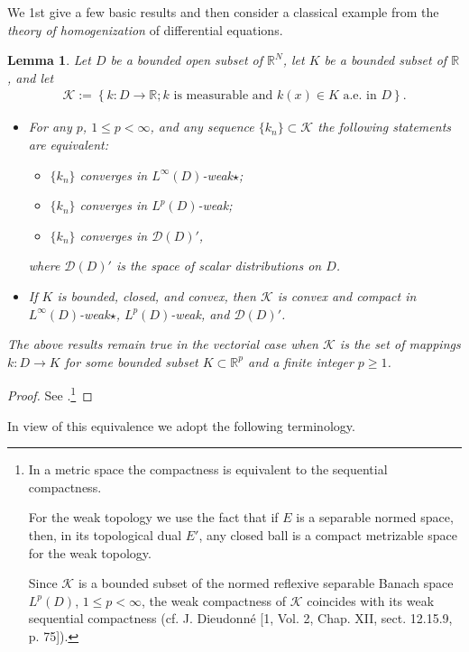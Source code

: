 \documentclass{book}
\numberwithin{equation}{section}
\newtheorem{lemma}{Lemma}[section]
\begin{document}
\begin{enumerate}
    We 1st give a few basic results and then consider a classical example from the \textit{theory of homogenization} of differential equations.
    
    \begin{lemma}
        Let $D$ be a bounded open subset of $\mathbb{R}^N$, let $K$ be a bounded subset of $\mathbb{R}$, and let
        \begin{align*}
            \mathcal{K} := \left\{k:D\to\mathbb{R};k \mbox{ is measurable and } k(x)\in K \mbox{ a.e. in } D\right\}.
        \end{align*}
        \begin{itemize}
            \item[(i)] For any $p$, $1\le p < \infty$, and any sequence $\{k_n\}\subset\mathcal{K}$ the following statements are equivalent:
            \begin{itemize}
                \item[(a)] $\{k_n\}$ converges in $L^\infty(D)$-weak$\star$;
                \item[(b)] $\{k_n\}$ converges in $L^p(D)$-weak;
                \item[(c)] $\{k_n\}$ converges in $\mathcal{D}(D)'$,
            \end{itemize}
            where $\mathcal{D}(D)'$ is the space of scalar distributions on $D$.
            \item[(ii)] If $K$ is bounded, closed, and convex, then $\mathcal{K}$ is convex and compact in $L^\infty(D)$-weak$\star$, $L^p(D)$-weak, and $\mathcal{D}(D)'$.
        \end{itemize}
        The above results remain true in the vectorial case when $\mathcal{K}$ is the set of mappings $k:D\to K$ for some bounded subset $K\subset\mathbb{R}^p$ and a finite integer $p\ge 1$.
    \end{lemma}
    
    \begin{proof}
        See \cite[p. 216]{Delfour_Zolesio2011}.\footnote{In a metric space the compactness is equivalent to the sequential compactness.
            
            For the weak topology we use the fact that if $E$ is a separable normed space, then, in its topological dual $E'$, any closed ball is a compact metrizable space for the weak topology.
            
            Since $\mathcal{K}$ is a bounded subset of the normed reflexive separable Banach space $L^p(D)$, $1\le p < \infty$, the weak compactness of $\mathcal{K}$ coincides with its weak sequential compactness (cf. J. Dieudonné [1, Vol. 2, Chap. XII, sect. 12.15.9, p. 75]).}
    \end{proof}
    In view of this equivalence we adopt the following terminology.
    

\end{enumerate}
\end{document}

